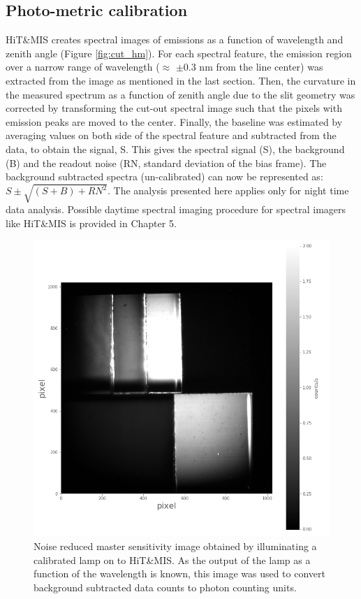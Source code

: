 \documentclass[crop=false,class=mitthesis,oneside,font=12pt]{standalone}
\begin{document}
\subsection{Photo-metric calibration}
HiT\&MIS creates spectral images of emissions as a function of wavelength and zenith angle (Figure \ref{fig:cut_hm}). For each spectral feature, the emission region over a narrow range of wavelength ($\approx$ $\pm$0.3 nm from the line center) was extracted from the image as mentioned in the last section. Then, the curvature in the measured spectrum as a function of zenith angle due to the slit geometry was corrected by transforming the cut-out spectral image such that the pixels with emission peaks are moved to the center. Finally, the baseline was estimated by averaging values on both side of the spectral feature and subtracted from the data, to obtain the signal, S. This gives the spectral signal (S), the background (B) and the readout noise (RN, standard deviation of the bias frame). The background subtracted spectra (un-calibrated) can now be represented as: $S \pm \sqrt{(S+B) + RN^2}$.  The analysis presented here applies only for night time data analysis. Possible daytime spectral imaging procedure for spectral imagers like HiT\&MIS is provided in Chapter 5.


\begin{figure}[H]
	\centering\includegraphics[width=30pc]{sen.png}
	\caption{Noise reduced master sensitivity image obtained by illuminating a calibrated lamp on to HiT\&MIS. As the output of the lamp as a function of the wavelength is known, this image was used to convert background subtracted data counts to photon counting units. }
	\label{fig:sen}
\end{figure}
\end{document}
